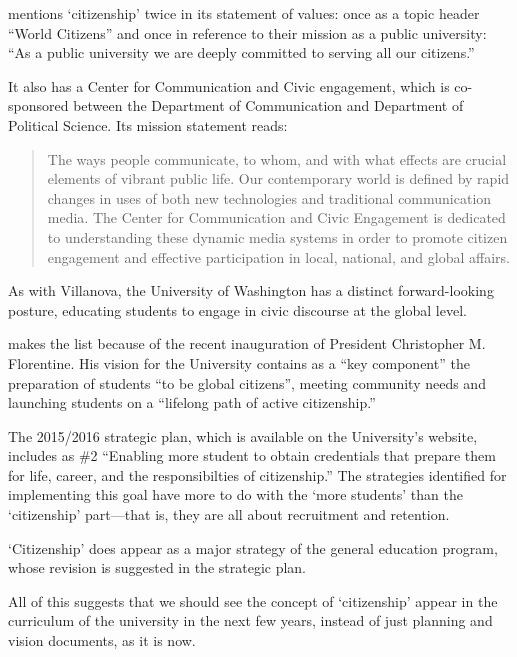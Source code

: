 mentions `citizenship' twice in its statement of values: once as a topic header ``World Citizens'' and once in reference to their mission as a public university: ``As a public university we are deeply committed to serving all our citizens.'' 

It also has a Center for Communication and Civic engagement, which is co-sponsored between the Department of Communication and Department of Political Science. Its mission statement reads:

\begin{quote}

The ways people communicate, to whom, and with what effects are crucial elements of vibrant public life. Our contemporary world is defined by rapid changes in uses of both new technologies and traditional communication media. The Center for Communication and Civic Engagement is dedicated to understanding these dynamic media systems in order to promote citizen engagement and effective participation in local, national, and global affairs.
\end{quote}

As with Villanova, the University of Washington has a distinct forward-looking posture, educating students to engage in civic discourse at the global level.

 makes the list because of the recent inauguration of President Christopher M. Florentine. His vision for the University contains as a ``key component'' the preparation of students ``to be global citizens'', meeting community needs and launching students on a ``lifelong path of active citizenship.''

The 2015\slash 2016 strategic plan, which is available on the University's website, includes as \#2 ``Enabling more student to obtain credentials that prepare them for life, career, and the responsibilties of citizenship.'' The strategies identified for implementing this goal have more to do with the `more students' than the `citizenship' part---that is, they are all about recruitment and retention.

`Citizenship' does appear as a major strategy of the general education program, whose revision is suggested in the strategic plan.

All of this suggests that we should see the concept of `citizenship' appear in the curriculum of the university in the next few years, instead of just planning and vision documents, as it is now.

